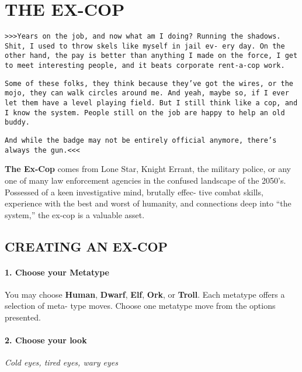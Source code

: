 
\section{THE EX-COP}
\begin{multicols}{3}
\setlength{\parskip}{.05cm}

\texttt{>>>Years on the job, and now what am I doing? Running
the shadows. Shit, I used to throw skels like myself in jail ev-
ery day. On the other hand, the pay is better than anything
I made on the force, I get to meet interesting people, and it
beats corporate rent-a-cop work.}

\texttt{Some of these folks, they think because they’ve got the wires,
or the mojo, they can walk circles around me. And yeah,
maybe so, if I ever let them have a level playing field. But I
still think like a cop, and I know the system. People still on the
job are happy to help an old buddy.}

\texttt{And while the badge may not be entirely official anymore,
there’s always the gun.<<<}

\textbf{The Ex-Cop} comes from Lone Star, Knight Errant, the
military police, or any one of many law enforcement
agencies in the confused landscape of the 2050’s.
Possessed of a keen investigative mind, brutally effec-
tive combat skills, experience with the best and worst
of humanity, and connections deep into “the system,”
the ex-cop is a valuable asset.


\subsection{CREATING AN EX-COP}

\paragraph{1.  Choose your Metatype}

You may choose \textbf{Human}, \textbf{Dwarf}, \textbf{Elf}, \textbf{Ork}, or
\textbf{Troll}. Each metatype offers a selection of meta-
type moves. Choose one metatype move from
the options presented.

\paragraph{2.  Choose your look}

\textit{Cold eyes, tired eyes, wary eyes}


\end{multicols}
